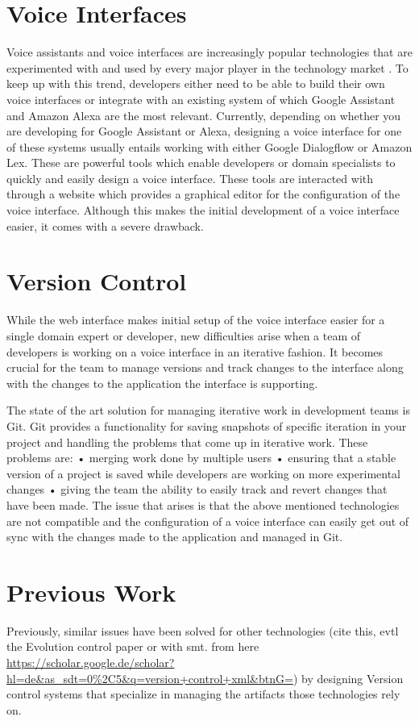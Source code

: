 \section{Voice Interfaces}
Voice assistants and voice interfaces are increasingly popular technologies that are experimented with and used by every major player in the technology market \citeNeeded. To keep up with this trend, developers either need to be able to build their own voice interfaces or integrate with an existing system of which Google Assistant and Amazon Alexa are the most relevant. \citeNeeded
Currently, depending on whether you are developing for Google Assistant or Alexa, designing a voice interface for one of these systems usually entails working with either Google Dialogflow or Amazon Lex. These are powerful tools which enable developers or domain specialists to quickly and easily design a voice interface.
These tools are interacted with through a website which provides a graphical editor for the configuration of the voice interface. Although this makes the initial development of a voice interface easier, it comes with a severe drawback.

\section{Version Control}
While the web interface makes initial setup of the voice interface easier for a single domain expert or developer, new difficulties arise when a team of developers is working on a voice interface in an iterative fashion. It becomes crucial for the team to manage versions and track changes to the interface along with the changes to the application the interface is supporting. \citeNeeded

The state of the art solution for managing iterative work in development teams is Git. \citeNeeded
Git provides a functionality for saving snapshots of specific iteration in your project and handling the problems that come up in iterative work.
These problems are:
•	merging work done by multiple users
•	ensuring that a stable version of a project is saved while developers are working on more experimental changes
•	giving the team the ability to easily track and revert changes that have been made.
The issue that arises is that the above mentioned technologies are not compatible and the configuration of a voice interface can easily get out of sync with the changes made to the application and managed in Git. \citeNeeded

\section{Previous Work}
Previously, similar issues have been solved for other technologies \citeNeeded (cite this, evtl the Evolution control paper or with smt. from here \url{https://scholar.google.de/scholar?hl=de&as_sdt=0%2C5&q=version+control+xml&btnG=})  by designing Version control systems that specialize in managing the artifacts those technologies rely on. 

